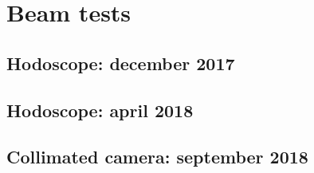 \chapter	{Beam tests}

\vfill

\minitoc

\newpage





\section{Hodoscope: december 2017}

\section{Hodoscope: april 2018}

\section{Collimated camera: september 2018}


\clearpage
